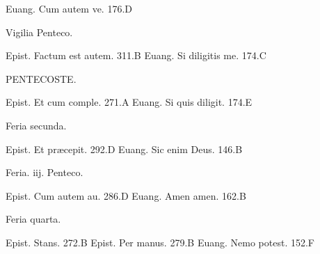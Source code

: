 \documentclass[a5paper,10pt]{book}
\def\ae{æ}
\begin{document}
\begin{multicols}{2}
\newline Euang. Cum autem ve. \hfill 176.D
\newline \vspace{-1.75em}
\begin{center}
\color{red} Vigilia Penteco.
\end{center}
\vspace{-.75em}
\par \noindent Epist. Factum est autem. \hfill 311.B
\newline Euang. Si diligitis me. \hfill 174.C
\newline \vspace{-1.25em}
\begin{center}
\color{red} \large PENTECOSTE.
\end{center}
\vspace{-.25em}
\par \noindent Epist. Et cum comple. \hfill 271.A
\newline Euang. Si quis diligit. \hfill 174.E
\newline \vspace{-1.75em}
\begin{center}
\color{red} Feria secunda.
\end{center}
\vspace{-.75em}
\par \noindent Epist. Et pr\ae cepit. \hfill 292.D
\newline Euang. Sic enim Deus. \hfill 146.B
\newline \vspace{-1.75em}
\begin{center}
\color{red} Feria. iij. Penteco.
\end{center}
\vspace{-.75em}
\par \noindent Epist. Cum autem au. \hfill 286.D
\newline Euang. Amen amen. \hfill 162.B
\newline \vspace{-1.75em}
\begin{center}
\color{red} Feria quarta.
\end{center}
\vspace{-.75em}
\par \noindent Epist. Stans. \hfill 272.B
\newline Epist. Per manus. \hfill 279.B
\newline Euang. Nemo potest. \hfill 152.F
\newline \vspace{-1.75em}

\end{multicols}
\end{document}
